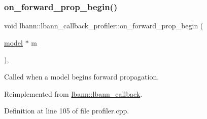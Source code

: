\subsubsection{\texorpdfstring{on\+\_\+forward\+\_\+prop\+\_\+begin()}{on\_forward\_prop\_begin()}\hspace{0.1cm}{\footnotesize\ttfamily [1/2]}}
{\footnotesize\ttfamily void lbann\+::lbann\+\_\+callback\+\_\+profiler\+::on\+\_\+forward\+\_\+prop\+\_\+begin (\begin{DoxyParamCaption}\item[{\hyperlink{classlbann_1_1model}{model} $\ast$}]{m }\end{DoxyParamCaption})\hspace{0.3cm}{\ttfamily [override]}, {\ttfamily [virtual]}}

Called when a model begins forward propagation. 

Reimplemented from \hyperlink{classlbann_1_1lbann__callback_a22ed977371173105b4aad3a20b9c59dc}{lbann\+::lbann\+\_\+callback}.



Definition at line 105 of file profiler.\+cpp.


